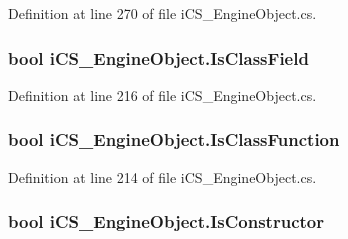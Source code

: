 Definition at line 270 of file i\+C\+S\+\_\+\+Engine\+Object.\+cs.

\hypertarget{classi_c_s___engine_object_a7792cf36acf1e277cc57b9e14a069f12}{
\subsubsection[{Is\+Class\+Field}]{\setlength{\rightskip}{0pt plus 5cm}bool i\+C\+S\+\_\+\+Engine\+Object.\+Is\+Class\+Field\hspace{0.3cm}{\ttfamily [get]}}}\label{classi_c_s___engine_object_a7792cf36acf1e277cc57b9e14a069f12}


Definition at line 216 of file i\+C\+S\+\_\+\+Engine\+Object.\+cs.

\hypertarget{classi_c_s___engine_object_a751b4e24ebb0398292a928ce1f167751}{
\subsubsection[{Is\+Class\+Function}]{\setlength{\rightskip}{0pt plus 5cm}bool i\+C\+S\+\_\+\+Engine\+Object.\+Is\+Class\+Function\hspace{0.3cm}{\ttfamily [get]}}}\label{classi_c_s___engine_object_a751b4e24ebb0398292a928ce1f167751}


Definition at line 214 of file i\+C\+S\+\_\+\+Engine\+Object.\+cs.

\hypertarget{classi_c_s___engine_object_a8551d5e4b321e0f99f2df2bb312f35d8}{
\subsubsection[{Is\+Constructor}]{\setlength{\rightskip}{0pt plus 5cm}bool i\+C\+S\+\_\+\+Engine\+Object.\+Is\+Constructor\hspace{0.3cm}{\ttfamily [get]}}}\label{classi_c_s___engine_object_a8551d5e4b321e0f99f2df2bb312f35d8}


